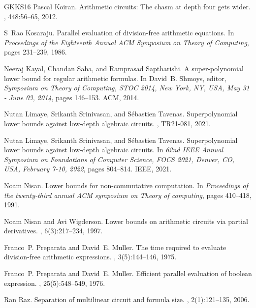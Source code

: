 \documentclass[10pt,a4paper]{article}
\begin{document}
\begin{thebibliography}{GKKS16}
Pascal Koiran.
\newblock Arithmetic circuits: The chasm at depth four gets wider.
, 448:56--65, 2012.

S~Rao Kosaraju.
\newblock Parallel evaluation of division-free arithmetic equations.
\newblock In {\em Proceedings of the Eighteenth Annual ACM Symposium on Theory
  of Computing}, pages 231--239, 1986.

Neeraj Kayal, Chandan Saha, and Ramprasad Saptharishi.
\newblock A super-polynomial lower bound for regular arithmetic formulas.
\newblock In David~B. Shmoys, editor, {\em Symposium on Theory of Computing,
  {STOC} 2014, New York, NY, USA, May 31 - June 03, 2014}, pages 146--153.
  {ACM}, 2014.

Nutan Limaye, Srikanth Srinivasan, and S{\'{e}}bastien Tavenas.
\newblock Superpolynomial lower bounds against low-depth algebraic circuits.
, {TR21-081}, 2021.

Nutan Limaye, Srikanth Srinivasan, and S{\'{e}}bastien Tavenas.
\newblock Superpolynomial lower bounds against low-depth algebraic circuits.
\newblock In {\em 62nd {IEEE} Annual Symposium on Foundations of Computer
  Science, {FOCS} 2021, Denver, CO, USA, February 7-10, 2022}, pages 804--814.
  {IEEE}, 2021.

Noam Nisan.
\newblock Lower bounds for non-commutative computation.
\newblock In {\em Proceedings of the twenty-third annual ACM symposium on
  Theory of computing}, pages 410--418, 1991.

Noam Nisan and Avi Wigderson.
\newblock Lower bounds on arithmetic circuits via partial derivatives.
, 6(3):217--234, 1997.

Franco~P. Preparata and David~E. Muller.
\newblock The time required to evaluate division-free arithmetic expressions.
, 3(5):144--146, 1975.

Franco~P. Preparata and David~E. Muller.
\newblock Efficient parallel evaluation of boolean expression.
, 25(5):548--549, 1976.

Ran Raz.
\newblock Separation of multilinear circuit and formula size.
, 2(1):121--135, 2006.


\end{thebibliography}
\end{document}
